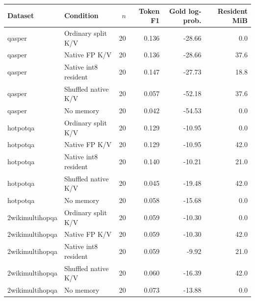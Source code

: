 \begin{tabular}{llrrrr}
\toprule
Dataset & Condition & $n$ & Token F1 & Gold log-prob. & Resident MiB \\
\midrule
qasper & Ordinary split K/V & 20 & 0.136 & -28.66 & 0.0 \\
qasper & Native FP K/V & 20 & 0.136 & -28.66 & 37.6 \\
qasper & Native int8 resident & 20 & 0.147 & -27.73 & 18.8 \\
qasper & Shuffled native K/V & 20 & 0.057 & -52.18 & 37.6 \\
qasper & No memory & 20 & 0.042 & -54.53 & 0.0 \\
hotpotqa & Ordinary split K/V & 20 & 0.129 & -10.95 & 0.0 \\
hotpotqa & Native FP K/V & 20 & 0.129 & -10.95 & 42.0 \\
hotpotqa & Native int8 resident & 20 & 0.140 & -10.21 & 21.0 \\
hotpotqa & Shuffled native K/V & 20 & 0.045 & -19.48 & 42.0 \\
hotpotqa & No memory & 20 & 0.058 & -15.68 & 0.0 \\
2wikimultihopqa & Ordinary split K/V & 20 & 0.059 & -10.30 & 0.0 \\
2wikimultihopqa & Native FP K/V & 20 & 0.059 & -10.30 & 42.0 \\
2wikimultihopqa & Native int8 resident & 20 & 0.059 & -9.92 & 21.0 \\
2wikimultihopqa & Shuffled native K/V & 20 & 0.060 & -16.39 & 42.0 \\
2wikimultihopqa & No memory & 20 & 0.073 & -13.88 & 0.0 \\
\bottomrule
\end{tabular}

